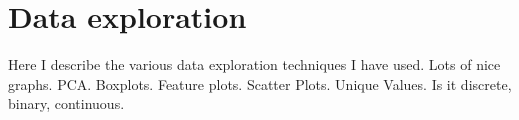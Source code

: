 \chapter{Data exploration}
Here I describe the various data exploration techniques I have used. Lots of nice graphs. PCA. Boxplots. Feature plots. Scatter Plots. Unique Values. Is it discrete, binary, continuous.
